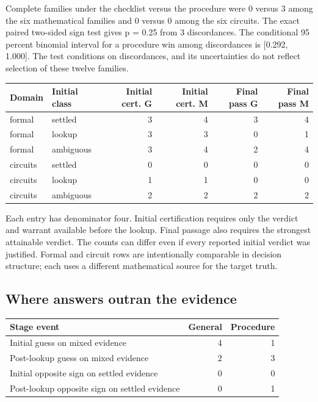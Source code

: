 \documentclass[12pt,letterpaper]{article}
\begin{document}
Complete families under the checklist versus the procedure were 0 versus 3 among the six mathematical families and 0 versus 0 among the six circuits. The exact paired two-sided sign test gives p = 0.25 from 3 discordances. The conditional 95 percent binomial interval for a procedure win among discordances is [0.292, 1.000]. The test conditions on discordances, and its uncertainties do not reflect selection of these twelve families.

\begin{center}\footnotesize\setlength{\tabcolsep}{4pt}\begin{tabularx}{\linewidth}{Ylrrrr}\toprule
Domain & Initial class & Initial cert. G & Initial cert. M & Final pass G & Final pass M\\\midrule
formal & settled & 3 & 4 & 3 & 4\\
formal & lookup & 3 & 3 & 0 & 1\\
formal & ambiguous & 3 & 4 & 2 & 4\\
circuits & settled & 0 & 0 & 0 & 0\\
circuits & lookup & 1 & 1 & 0 & 0\\
circuits & ambiguous & 2 & 2 & 2 & 2\\
\bottomrule\end{tabularx}\end{center}


Each entry has denominator four. Initial certification requires only the verdict and warrant available before the lookup. Final passage also requires the strongest attainable verdict. The counts can differ even if every reported initial verdict was justified. Formal and circuit rows are intentionally comparable in decision structure; each uses a different mathematical source for the target truth.

\subsection{Where answers outran the evidence}

\begin{center}\footnotesize\setlength{\tabcolsep}{4pt}\begin{tabularx}{\linewidth}{Yrr}\toprule
Stage event & General & Procedure\\\midrule
Initial guess on mixed evidence & 4 & 1\\
Post-lookup guess on mixed evidence & 2 & 3\\
Initial opposite sign on settled evidence & 0 & 0\\
Post-lookup opposite sign on settled evidence & 0 & 1\\
\bottomrule\end{tabularx}\end{center}
\end{document}
